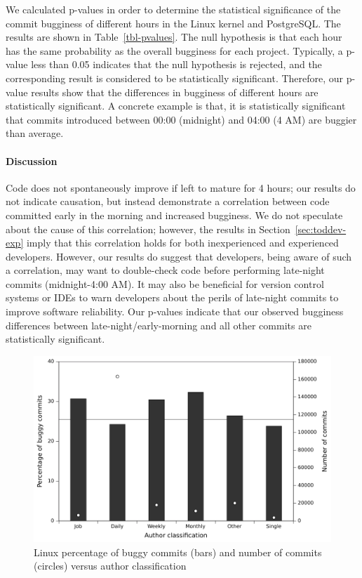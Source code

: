 We calculated p-values in order to determine the statistical significance of
the commit bugginess of different hours in the Linux kernel and PostgreSQL. 
The results are shown in Table~\ref{tbl-pvalues}. The null hypothesis is that 
each hour has the same probability as the overall bugginess for each project. 
Typically, a p-value less than 0.05 indicates that 
the null hypothesis is rejected, and the corresponding result 
is considered to be statistically significant.
Therefore, our p-value results show that the differences in bugginess of 
different hours are statistically significant. A concrete example is that, 
it is statistically significant that commits introduced 
between 00:00 (midnight) and 04:00 (4 AM) are buggier than average. 

\paragraph{Discussion}

Code does not spontaneously improve if left to mature for 4 hours; 
our results do not indicate causation,
but instead demonstrate a correlation between code committed early in the 
morning and increased bugginess. We do not speculate about the cause
of this correlation; however, the results in Section~\ref{sec:toddev-exp}
imply that this correlation holds for both inexperienced and experienced
developers.
However, our results do suggest that developers, being aware of such a 
correlation, may want to double-check code before performing
late-night commits (midnight-4:00 AM).  It may also be
beneficial for version control systems or IDEs to warn developers about
the perils of late-night
commits to improve software reliability. 
Our p-values indicate that our
observed bugginess differences between late-night/early-morning and all other commits are statistically significant.

\begin{figure}[t!hb]
\begin{center}
\includegraphics[width=\columnwidth]{linux-bugginess-author-class.pdf}
\end{center}
\caption{\label{fig-linux-bugginess-author-class}Linux percentage of buggy
  commits (bars) and number of commits (circles) versus author classification}
\end{figure}

